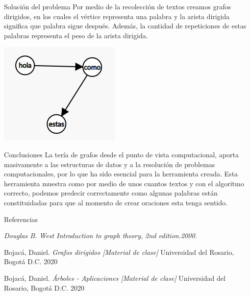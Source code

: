 \documentclass{beamer}
\begin{document}
\begin{frame}{Solución del problema}
    Por medio de la recolección de textos creamos grafos dirigidos, en los cuales el vértice representa una palabra y la arista dirigida significa que palabra sigue después. Además, la cantidad de repeticiones de estas palabras representa el peso de la arista dirigida.
    
    \begin{center}
        \includegraphics[width=.4\textwidth]{g3.png}
    \end{center}
    
\end{frame}

\begin{frame}{Conclusiones}
La tería de grafos desde el punto de vista computacional, aporta masivamente a las estructuras de datos y a la resolución de problemas computacionales, por lo que ha sido esencial para la herramienta creada.
Esta herramienta muestra como por medio de unos cuantos textos y con el algoritmo correcto, podemos predecir correctamente como algunas palabras están constituidadas para que al momento de crear oraciones esta tenga sentido.
\end{frame}

\begin{frame}{Referencias}

\begin{thebibliography}{3}
\textit{Douglas B. West Introduction to graph theory, 2nd edition.2000.}

\bibitem{}
Bojacá, Daniel.
\textit{Grafos dirigidos [Material de clase]}
Universidad del Rosario, Bogotá D.C. 2020

\bibitem{}
Bojacá, Daniel.
\textit{Árboles - Aplicaciones [Material de clase]}
Universidad del Rosario, Bogotá D.C. 2020

\end{thebibliography}
    
\end{frame}
\end{document}
